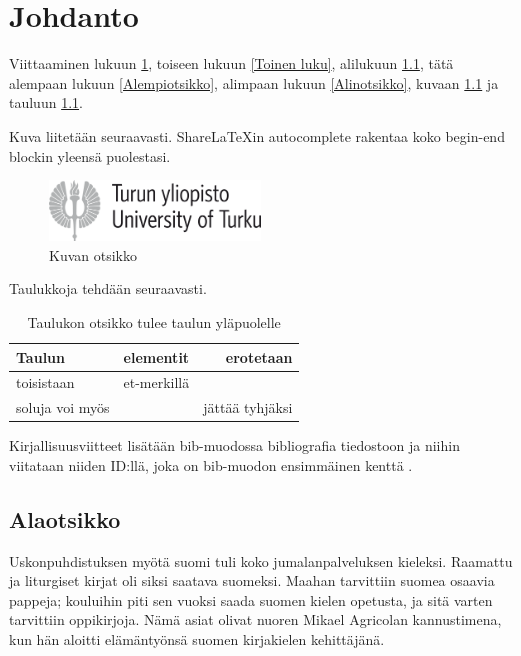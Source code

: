 \chapter{Johdanto} \label{Johdanto}

Viittaaminen lukuun \ref{Johdanto}, toiseen lukuun \ref{Toinen luku},
alilukuun \ref{Alaotsikko}, tätä alempaan lukuun \ref{Alempiotsikko},
alimpaan lukuun \ref{Alinotsikko}, kuvaan \ref{Kuvaesimerkki} ja
tauluun \ref{Tauluesimerkki}.

Kuva liitetään seuraavasti. ShareLaTeXin autocomplete rakentaa koko
begin-end blockin yleensä puolestasi.

\begin{figure}
\centering \includegraphics[width=0.5\textwidth]{kuvat/turun-yliopisto-logo-rgb}
\caption{Kuvan otsikko}
\label{Kuvaesimerkki} 
\end{figure}

Taulukkoja tehdään seuraavasti.

\begin{table}
\centering \caption{Taulukon otsikko tulee taulun yläpuolelle}
\begin{centering}
\begin{tabular}{l|c|r|}
Taulun  & elementit  & erotetaan \tabularnewline
\hline 
toisistaan  & et-merkillä  & \tabularnewline
soluja voi myös  &  & jättää tyhjäksi \tabularnewline
\end{tabular}\label{Tauluesimerkki} 
\end{centering}
\end{table}

Kirjallisuusviitteet lisätään bib-muodossa bibliografia tiedostoon
ja niihin viitataan niiden ID:llä, joka on bib-muodon ensimmäinen
kenttä \cite{crawley2007write}.

\section{Alaotsikko}

\label{Alaotsikko}

Uskonpuhdistuksen myötä suomi tuli koko jumalanpalveluksen kieleksi.
Raamattu ja liturgiset kirjat oli siksi saatava suomeksi. Maahan tarvittiin
suomea osaavia pappeja; kouluihin piti sen vuoksi saada suomen kielen
opetusta, ja sitä varten tarvittiin oppikirjoja. Nämä asiat olivat
nuoren Mikael Agricolan kannustimena, kun hän aloitti elämäntyönsä
suomen kirjakielen kehittäjänä.

